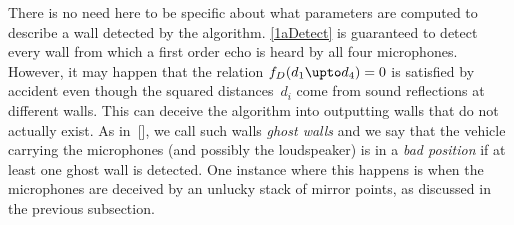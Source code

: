 \documentclass[reqno]{amsart}
\begin{document}
There is no need here to be specific about what parameters are
computed to describe a wall detected by the algorithm. \cref{1aDetect}
is guaranteed to detect every wall from which a first order echo is
heard by all four microphones. However, it may happen that the
relation $f_D(d_1 \upto d_4) = 0$ is satisfied by accident even though
the squared distances~$d_i$ come from sound reflections at different
walls. This can deceive the algorithm into outputting walls that do
not actually exist. As in~[], we call
such walls {\em ghost walls} and we say that the vehicle carrying the
microphones (and possibly the loudspeaker) is in a {\em bad position}
if at least one ghost wall is detected. One instance where this
happens is when the microphones are deceived by an unlucky stack of mirror points, as
discussed in the previous subsection.

\end{document}
